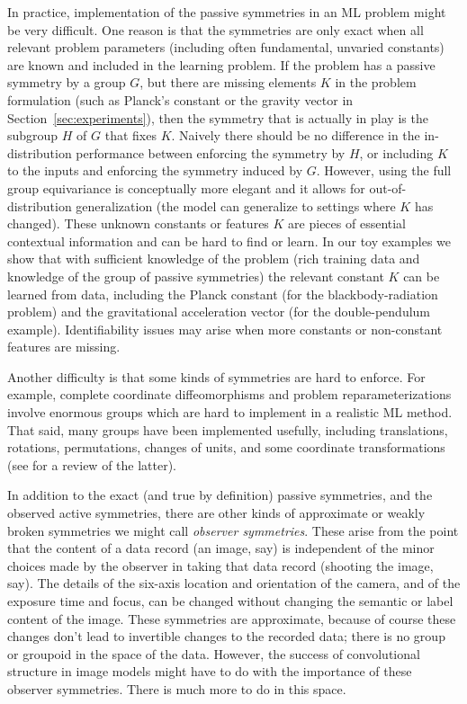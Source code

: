 \documentclass{article}
\theoremstyle{plain}
\theoremstyle{definition}
\theoremstyle{remark}
\newcommand{\sectionname}{Section}
\newcommand{\secref}[1]{\sectionname~\ref{#1}}
\begin{document}
In practice, implementation of the passive symmetries in an ML problem might be very difficult.
One reason is that the symmetries are only exact when all relevant problem parameters (including often fundamental, unvaried constants) are known and included in the learning problem.
If the problem has a passive symmetry by a group $G$, but there are missing elements $K$ in the problem formulation (such as Planck's constant or the gravity vector in \secref{sec:experiments}), then the symmetry that is actually in play is the subgroup $H$ of $G$ that fixes $K$. 
Naively there should be no difference in the in-distribution performance between enforcing the symmetry by $H$, or including $K$ to the inputs and enforcing the symmetry induced by $G$. 
However, using the full group equivariance is conceptually more elegant and it allows for out-of-distribution generalization (the model can generalize to settings where  $K$ has changed).
These unknown constants or features $K$ are pieces of essential contextual information and can be hard to find or learn. 
In our toy examples we show that with sufficient knowledge of the problem (rich training data and knowledge of the group of passive symmetries) the relevant constant $K$ can be learned from data, including the Planck constant (for the blackbody-radiation problem) and the gravitational acceleration vector (for the double-pendulum example).
Identifiability issues may arise when more constants or non-constant features are missing.

Another difficulty is that some kinds of symmetries are hard to enforce.
For example, complete coordinate diffeomorphisms and problem reparameterizations involve enormous groups which are hard to implement in a realistic ML method.
That said, many groups have been implemented usefully, including translations, rotations, permutations, changes of units, and some coordinate transformations (see \citealt{weiler} for a review of the latter). 

In addition to the exact (and true by definition) passive symmetries, and the observed active symmetries, there are other kinds of approximate or weakly broken symmetries we might call \emph{observer symmetries}.
These arise from the point that the content of a data record (an image, say) is independent of the minor choices made by the observer in taking that data record (shooting the image, say).
The details of the six-axis location and orientation of the camera, and of the exposure time and focus, can be changed without changing the semantic or label content of the image.
These symmetries are approximate, because of course these changes don't lead to invertible changes to the recorded data; there is no group or groupoid in the space of the data.
However, the success of convolutional structure in image models might have to do with the importance of these observer symmetries.
There is much more to do in this space.
\end{document}
